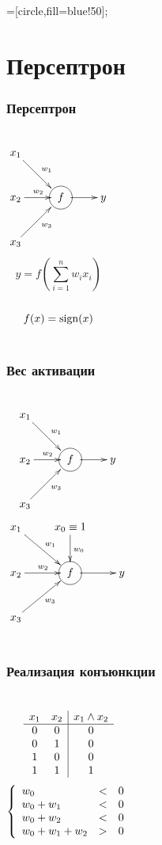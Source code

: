 \documentclass[24pt,pdf,hyperref={unicode}]{beamer}
\begin{document}
=[circle,fill=blue!50];


\section{Персептрон}

\begin{frame}\frametitle{Персептрон}
\begin{columns}
$$
\xymatrix
{
x_1 \ar@{->}[rd]^{w_1} \\
x_2 \ar@{->}[r]^{w_2} & *++[Fo]{f} \ar@{->}[r] & y\\
x_3 \ar@{->}[ru]_{w_3} \\
}
$$
$$
y=f\left(\sum_{i=1}^{n}w_ix_i\right)
$$\\[1cm]
$$
f(x)={\rm sign}(x)
$$
\end{columns}
\end{frame}


\begin{frame}\frametitle{Вес активации}
\begin{columns}
$$
\xymatrix
{
x_1 \ar@{->}[rd]^{w_1} \\
x_2 \ar@{->}[r]^{w_2} & *++[Fo]{f} \ar@{->}[r] & y\\
x_3 \ar@{->}[ru]_{w_3} \\
}
$$
$$
\xymatrix
{
x_1 \ar@{->}[rd]^{w_1} & x_0\equiv 1 \ar@{->}[d]^{w_0}\\
x_2 \ar@{->}[r]^{w_2} & *++[Fo]{f} \ar@{->}[r] & y\\
x_3 \ar@{->}[ru]_{w_3} \\
}
$$
\end{columns}
\end{frame}

\begin{frame}\frametitle{Реализация конъюнкции}
\begin{columns}
$$
\begin{array}{c c | c}
x_1 & x_2 & x_1\wedge x_2 \\
\hline
0 & 0 & 0 \\
0 & 1 & 0 \\
1 & 0 & 0 \\
1 & 1 & 1 \\
\end{array}
$$
$$
\left\{
\begin{array}{l l l l l l}
 w_0       & < & 0 \\
 w_0 + w_1 & < & 0 \\
 w_0 + w_2 & < & 0 \\
 w_0 + w_1 + w_2 & > & 0 \\
\end{array}
\right.
$$\\[1cm]
\end{columns}
\end{frame}
\end{document}
